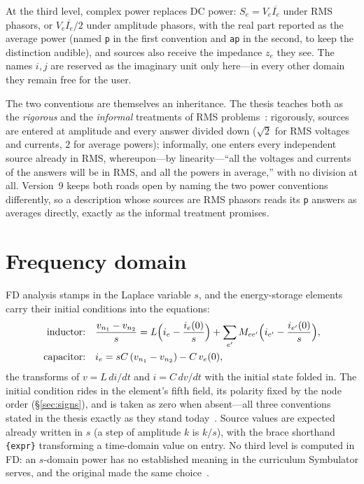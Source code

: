 \documentclass[11pt,oneside]{report}
\newcommand{\code}[1]{\texttt{#1}}
\begin{document}
At the third level, complex power replaces DC power:
$S_e = V_e \overline{I_e}$ under RMS phasors, or
$V_e \overline{I_e}/2$ under amplitude phasors, with the real part
reported as the average power (named \code{p} in the first convention
and \code{ap} in the second, to keep the distinction audible), and
sources also receive the impedance $z_e$ they see. The names $i, j$
are reserved as the imaginary unit only here---in every other domain
they remain free for the user.

The two conventions are themselves an inheritance. The thesis
teaches both as the \emph{rigorous} and the \emph{informal}
treatments of RMS problems~\cite[\S6.13]{thesis2000}: rigorously,
sources are entered at amplitude and every answer divided down
($\sqrt2$ for RMS voltages and currents, $2$ for average powers);
informally, one enters every independent source already in RMS,
whereupon---by linearity---``all the voltages and currents of the
answers will be in RMS, and all the powers in average,'' with no
division at all. Version~9 keeps both roads open by naming the two
power conventions differently, so a description whose sources are
RMS phasors reads its \code{p} answers as averages directly, exactly
as the informal treatment promises.

\section{Frequency domain}
\label{sec:fd}

FD analysis stamps in the Laplace variable $s$, and the energy-storage
elements carry their initial conditions into the equations:
\begin{align}
\text{inductor:}\quad & \frac{v_{n_1} - v_{n_2}}{s}
  = L\Bigl(i_e - \frac{i_e(0)}{s}\Bigr)
  + \sum_{e'} M_{ee'}\Bigl(i_{e'} - \frac{i_{e'}(0)}{s}\Bigr), \\
\text{capacitor:}\quad & i_e = sC\,(v_{n_1} - v_{n_2}) - C\,v_e(0),
\end{align}
the transforms of $v = L\,di/dt$ and $i = C\,dv/dt$ with the initial
state folded in. The initial condition rides in the element's fifth
field, its polarity fixed by the node order (\S\ref{sec:signs}), and
is taken as zero when absent---all three conventions stated in the
thesis exactly as they stand today~\cite[\S10.3]{thesis2000}. Source
values are expected already written in $s$ (a step of amplitude $k$
is $k/s$), with the brace shorthand \code{\{expr\}} transforming a
time-domain value on entry. No third level is computed in FD: an
$s$-domain power has no established meaning in the curriculum
Symbulator serves, and the original made the same
choice~\cite[\S10.4]{thesis2000}.
\end{document}
